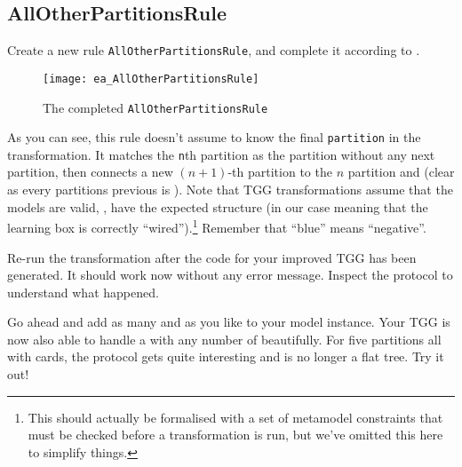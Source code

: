 \newpage
\hypertarget{allCards vis}{}
\subsection{AllOtherPartitionsRule}
\genHeader

\begin{stepbystep}

\item Create a new rule \texttt{AllOtherPartitionsRule}, and complete it according to .


\begin{figure}[htbp]
\begin{center}
  \texttt{[image: ea\_AllOtherPartitionsRule]}
  \caption{The completed \texttt{AllOtherPartitionsRule}}
  \label{fig:ea_AllOtherPartitionsRuleComplete}
\end{center}
\end{figure}

\item As you can see, this rule doesn't assume to know the final \texttt{partition} in the transformation. 
It matches the \texttt{n}th partition as the partition without any next partition, then connects a new $(n+1)$-th partition to the $n$ partition and  (clear as every partitions previous is ).
Note that TGG transformations assume that the models are valid, \idest, have the expected structure (in our case meaning that the learning box is correctly \enquote{wired}).\footnote{This should actually be formalised with a set of metamodel constraints that must be checked before a transformation is run, but we've omitted this here to simplify things.}  
Remember that \enquote{blue} means \enquote{negative}.

\item Re-run the transformation after the code for your improved TGG has been generated. 
It should work now without any error message.
Inspect the protocol to understand what happened.

\item Go ahead and add as many  and  as you like to your model instance.
Your TGG is now also able to handle a  with any number of  beautifully.
For five partitions all with cards, the protocol gets quite interesting and is no longer a flat tree.
Try it out! 

\end{stepbystep}



